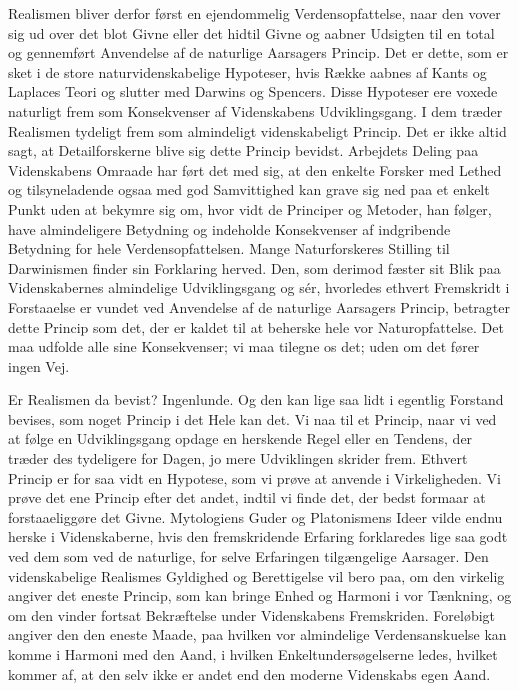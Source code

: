 \documentclass[12pt,a4paper]{article}
\begin{document}
Realismen bliver derfor først en ejendommelig Verdensopfattelse, naar
den vover sig ud over det blot Givne eller det hidtil Givne og aabner
Udsigten til en total og gennemført Anvendelse af de naturlige Aarsagers
Princip. Det er dette, som er sket i de store naturvidenskabelige
Hypoteser, hvis Række aabnes af Kants og Laplaces Teori og slutter med
Darwins og Spencers. Disse Hypoteser ere voxede naturligt frem som
Konsekvenser af Videnskabens Udviklingsgang. I dem træder Realismen
tydeligt frem som almindeligt videnskabeligt Princip. Det er ikke altid
sagt, at Detailforskerne blive sig dette Princip bevidst. Arbejdets
Deling paa Videnskabens Omraade har ført det med sig, at den enkelte
Forsker med Lethed og tilsyneladende ogsaa med god Samvittighed kan
grave sig ned paa et enkelt Punkt uden at bekymre sig om, hvor vidt de
Principer og Metoder, han følger, have almindeligere Betydning og
indeholde Konsekvenser af indgribende Betydning for hele
Verdensopfattelsen. Mange Naturforskeres Stilling til Darwinismen finder
sin Forklaring herved. Den, som derimod fæster sit Blik paa
Videnskabernes almindelige Udviklingsgang og sér, hvorledes ethvert
Fremskridt i Forstaaelse er vundet ved Anvendelse af de naturlige
Aarsagers Princip, betragter dette Princip som det, der er kaldet til at
beherske hele vor Naturopfattelse. Det maa udfolde alle sine Konsekvenser;
vi maa tilegne os det; uden om det fører ingen Vej.

Er Realismen da bevist? Ingenlunde. Og den kan lige saa lidt i egentlig
Forstand bevises, som noget Princip i det Hele kan det. Vi naa til et
Princip, naar vi ved at følge en Udviklingsgang opdage en herskende
Regel eller en Tendens, der træder des tydeligere for Dagen, jo mere
Udviklingen skrider frem. Ethvert Princip er for saa vidt en Hypotese,
som vi prøve at anvende i Virkeligheden. Vi prøve det ene Princip efter
det andet, indtil vi finde det, der bedst formaar at forstaaeliggøre
det Givne. Mytologiens Guder og Platonismens Ideer vilde endnu herske i
Videnskaberne, hvis den fremskridende Erfaring forklaredes lige saa godt
ved dem som ved de naturlige, for selve Erfaringen tilgængelige Aarsager.
Den videnskabelige Realismes Gyldighed og Berettigelse vil bero paa, om
den virkelig angiver det eneste Princip, som kan bringe Enhed og Harmoni
i vor Tænkning, og om den vinder fortsat Bekræftelse under Videnskabens
Fremskriden. Foreløbigt angiver den den eneste Maade, paa hvilken vor
almindelige Verdensanskuelse kan komme i Harmoni med den Aand, i hvilken
Enkeltundersøgelserne ledes, hvilket kommer af, at den selv ikke er
andet end den moderne Videnskabs egen Aand.
\end{document}

